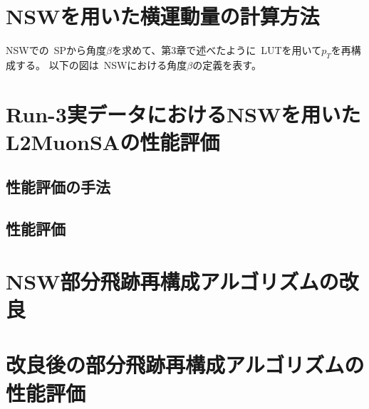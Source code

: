 \section{NSWを用いた横運動量の計算方法}\label{5-2}
NSWでの~SPから角度$\beta$を求めて、第3章で述べたように~LUTを用いて$p_T$を再構成する。
以下の図は~NSWにおける角度$\beta$の定義を表す。

\section{Run-3実データにおけるNSWを用いたL2MuonSAの性能評価}\label{5-3}

\subsection{性能評価の手法}
\subsection{性能評価}

\section{NSW部分飛跡再構成アルゴリズムの改良}\label{5-4}

\section{改良後の部分飛跡再構成アルゴリズムの性能評価}\label{5-5}